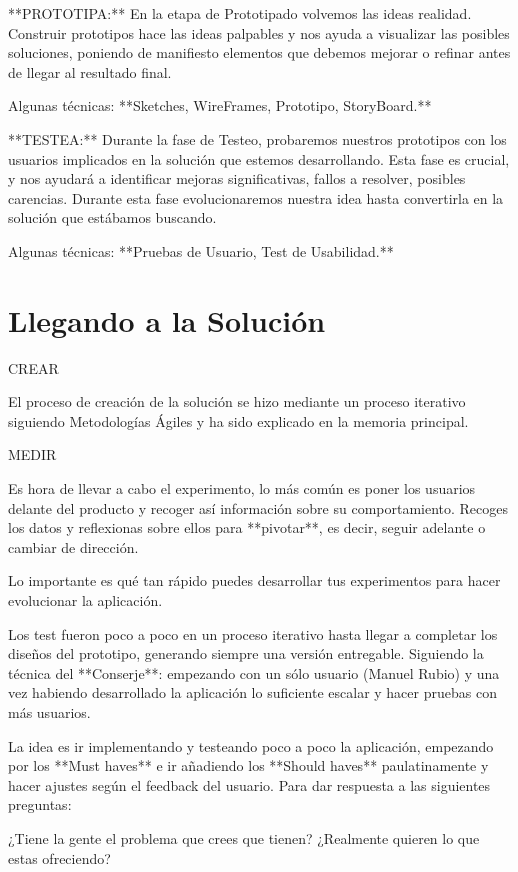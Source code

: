 \documentclass[12pt,twoside,titlepage]{report}
\begin{document}
**PROTOTIPA:** En la etapa de Prototipado volvemos las ideas realidad. Construir prototipos hace las ideas palpables y nos ayuda a visualizar las posibles soluciones, poniendo de manifiesto elementos que debemos mejorar o refinar antes de llegar al resultado final.

Algunas técnicas: **Sketches, WireFrames, Prototipo, StoryBoard.**

**TESTEA:** Durante la fase de Testeo, probaremos nuestros prototipos con los usuarios implicados en la solución que estemos desarrollando. Esta fase es crucial, y nos ayudará a identificar mejoras significativas, fallos a resolver, posibles carencias. Durante esta fase evolucionaremos nuestra idea hasta convertirla en la solución que estábamos buscando.

Algunas técnicas: **Pruebas de Usuario, Test de Usabilidad.**

\section{Llegando a la Solución}

CREAR

El proceso de creación de la solución se hizo mediante un proceso iterativo siguiendo Metodologías Ágiles y ha sido explicado en la memoria principal.

MEDIR

Es hora de llevar a cabo el experimento, lo más común es poner los usuarios delante del producto y recoger así información sobre su comportamiento. Recoges los datos y reflexionas sobre ellos para **pivotar**, es decir, seguir adelante o cambiar de dirección. 

Lo importante es qué tan rápido puedes desarrollar tus experimentos para hacer evolucionar la aplicación. 

Los test fueron poco a poco en un proceso iterativo hasta llegar a completar los diseños del prototipo, generando siempre una versión entregable. Siguiendo la técnica del **Conserje**: empezando con un sólo usuario (Manuel Rubio) y una vez habiendo desarrollado la aplicación lo suficiente escalar y hacer pruebas con más usuarios.

La idea es ir implementando y testeando poco a poco la aplicación, empezando por los **Must haves** e ir añadiendo los **Should haves** paulatinamente y hacer ajustes según el feedback del usuario. Para dar respuesta a las siguientes preguntas:

¿Tiene la gente el problema que crees que tienen? ¿Realmente quieren lo que estas ofreciendo?
\end{document}
